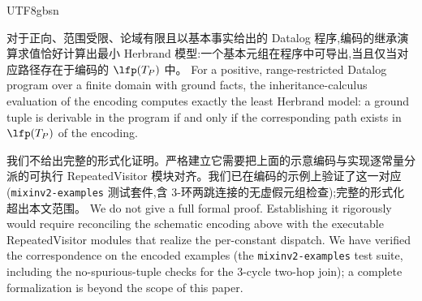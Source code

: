 \begin{CJK*}{UTF8}{gbsn}
\begin{proposition}%
  \label{prop:datalog-correspondence}
  \ifPaperChinese
  对于正向、范围受限、论域有限且以基本事实给出的 Datalog 程序,编码的继承演算求值恰好计算出最小 Herbrand 模型:一个基本元组在程序中可导出,当且仅当对应路径存在于编码的 $\lfp(T_P)$ 中。
  \else
  For a positive, range-restricted Datalog program over a finite domain with
  ground facts, the inheritance-calculus evaluation of the encoding computes
  exactly the least Herbrand model: a ground tuple is derivable in the program
  if and only if the corresponding path exists in $\lfp(T_P)$ of the encoding.
  \fi
\end{proposition}
\ifPaperChinese
我们不给出完整的形式化证明。严格建立它需要把上面的示意编码与实现逐常量分派的可执行 RepeatedVisitor 模块对齐。我们已在编码的示例上验证了这一对应(\nolinkurl{mixinv2-examples} 测试套件,含 3-环两跳连接的无虚假元组检查);完整的形式化超出本文范围。
\else
We do not give a full formal proof. Establishing it rigorously would require
reconciling the schematic encoding above with the executable RepeatedVisitor
modules that realize the per-constant dispatch. We have verified the
correspondence on the encoded examples (the \nolinkurl{mixinv2-examples} test
suite, including the no-spurious-tuple checks for the 3-cycle two-hop join); a
complete formalization is beyond the scope of this paper.
\fi

\section{}
\label{app:evaluation-trace}


\end{CJK*}
